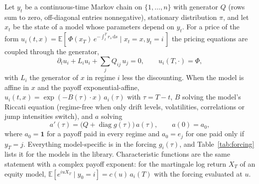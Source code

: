 \documentclass[11pt]{article}
\theoremstyle{remark}
\newcommand{\E}{\mathbb{E}}
\newcommand{\dd}{\,\mathrm{d}}
\newcommand{\diag}{\operatorname{diag}}
\begin{document}
Let $y_t$ be a continuous-time Markov chain on $\{1,\dots,n\}$ with generator $Q$ (rows sum to zero, off-diagonal
entries nonnegative), stationary distribution $\pi$, and let $x_t$ be the state of a model whose parameters depend
on $y_t$. For a price of the form $u_i(t,x) = \E[\,\Phi(x_T)\,e^{-\int_t^T r_s \dd s} \mid x_t = x, y_t = i\,]$ the
pricing equations are coupled through the generator,
\begin{equation}
  \partial_t u_i + L_i u_i + \sum_j Q_{ij}\, u_j = 0, \qquad u_i(T,\cdot) = \Phi,
  \label{eq:coupled}
\end{equation}
with $L_i$ the generator of $x$ in regime $i$ less the discounting. When the model is affine in $x$ and the payoff
exponential-affine, $u_i(t,x) = \exp(-B(\tau)\cdot x)\,a_i(\tau)$ with $\tau = T - t$, $B$ solving the model's
Riccati equation (regime-free when only drift levels, volatilities, correlations or jump intensities switch), and
$a$ solving
\begin{equation}
  a'(\tau) = \big(Q + \diag g(\tau)\big)\,a(\tau), \qquad a(0) = a_0,
  \label{eq:reduced}
\end{equation}
where $a_0 = \mathbf{1}$ for a payoff paid in every regime and $a_0 = e_j$ for one paid only if $y_T = j$.
Everything model-specific is in the forcing $g_i(\tau)$, and Table~\ref{tab:forcing} lists it for the models in
the library. Characteristic functions are the same statement with a complex payoff exponent: for the martingale
log return $X_T$ of an equity model, $\E[e^{iuX_T}\mid y_0 = i] = c(u)\,a_i(T)$ with the forcing evaluated at $u$.
\end{document}
